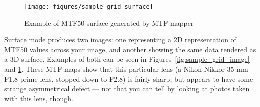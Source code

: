 \documentclass[a4paper]{article}
\begin{document}
\begin{figure}[hp!]
\centering
\texttt{[image: figures/sample\_grid\_surface]}
\caption{Example of MTF50 surface generated by MTF mapper}
\label{fig:sample_grid_surface}
\end{figure}

Surface mode produces two images: one representing a 2D
representation of MTF50 values across your image, and another showing the
same data rendered as a 3D surface. Examples of both can be seen in
Figures~\ref{fig:sample_grid_image} and \ref{fig:sample_grid_surface}. These
MTF maps show that this particular lens (a Nikon Nikkor 35 mm F1.8 prime
lens, stopped down to F2.8) is fairly sharp, but appears to have some
strange asymmetrical defect --- not that you can tell by looking at photos
taken with this lens, though.


\newpage
\end{document}
